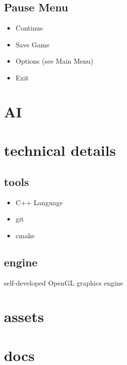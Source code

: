 \documentclass[
	fontsize=12pt,
    paper=a4,
    pagesize=auto,
    parskip=half,
    titlepage=on,
    ngerman
]{scrartcl}
\begin{document}
\subsection{Pause Menu}
  \begin{itemize}
  	\item Continue
  	\item Save Game
  	\item Options (see Main Menu)
  	\item Exit
  \end{itemize}

\section{AI}

\section{technical details}

\subsection{tools}
  \begin{itemize}
  	\item C++ Language
  	\item git
  	\item cmake
  \end{itemize}
\subsection{engine}
  self-developed OpenGL graphics engine
\section{assets}

\section{docs}
\end{document}
